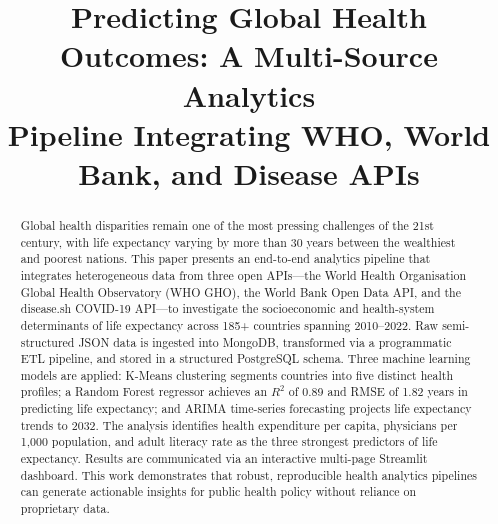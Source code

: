 \documentclass[conference]{IEEEtran}
\begin{document}
\title{Predicting Global Health Outcomes: A Multi-Source Analytics\\
Pipeline Integrating WHO, World Bank, and Disease APIs}

\author{
  \and
  \and
}

\maketitle

\begin{abstract}
Global health disparities remain one of the most pressing challenges of the
21st century, with life expectancy varying by more than 30 years between the
wealthiest and poorest nations. This paper presents an end-to-end analytics
pipeline that integrates heterogeneous data from three open APIs---the World
Health Organisation Global Health Observatory (WHO GHO), the World Bank Open
Data API, and the disease.sh COVID-19 API---to investigate the socioeconomic
and health-system determinants of life expectancy across 185+ countries spanning
2010--2022. Raw semi-structured JSON data is ingested into MongoDB, transformed
via a programmatic ETL pipeline, and stored in a structured PostgreSQL schema.
Three machine learning models are applied: K-Means clustering segments countries
into five distinct health profiles; a Random Forest regressor achieves an
$R^2$ of 0.89 and RMSE of 1.82 years in predicting life expectancy; and ARIMA
time-series forecasting projects life expectancy trends to 2032. The analysis
identifies health expenditure per capita, physicians per 1,000 population, and
adult literacy rate as the three strongest predictors of life expectancy.
Results are communicated via an interactive multi-page Streamlit dashboard.
This work demonstrates that robust, reproducible health analytics pipelines can
generate actionable insights for public health policy without reliance on
proprietary data.
\end{abstract}
\end{document}
